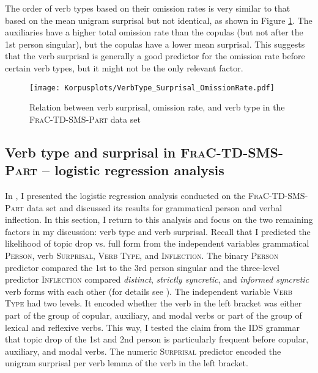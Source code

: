 The order of verb types based on their omission rates is very similar to that based on the mean unigram surprisal but not identical, as shown in Figure \ref{fig:frac.surprisal.rate.verb.type}.
The auxiliaries have a higher total omission rate than the copulas (but not after the 1st person singular), but the copulas have a lower mean surprisal.
This suggests that the verb surprisal is generally a good predictor for the omission rate before certain verb types, but it might not be the only relevant factor.

\begin{figure}
\centering
\texttt{[image: Korpusplots/VerbType\_Surprisal\_OmissionRate.pdf]}
\caption{Relation between verb surprisal, omission rate, and verb type in the \textsc{FraC-TD-SMS-Part} data set}
\label{fig:frac.surprisal.rate.verb.type}
\end{figure}

\subsection{Verb type and surprisal in \textsc{FraC-TD-SMS-Part} -- logistic regression analysis}\label{sec:corpus.regression.rep}
In , I presented the logistic regression analysis conducted on the \textsc{FraC-TD-SMS-Part} data set and discussed its results for grammatical person and verbal inflection.
In this section, I return to this analysis and focus on the two remaining factors in my discussion: verb type and verb surprisal.
Recall that I predicted the likelihood of topic drop vs. full form from the independent variables grammatical \textsc{Person}, verb \textsc{Surprisal}, \textsc{Verb Type}, and \textsc{Inflection}.
The binary \textsc{Person} predictor compared the 1st to the 3rd person singular and the three-level predictor \textsc{Inflection} compared \textit{distinct}, \textit{strictly syncretic}, and \textit{informed syncretic} verb forms with each other (for details see ).
The independent variable \textsc{Verb Type} had two levels.
It encoded whether the verb in the left bracket was either part of the group of copular, auxiliary, and modal verbs or part of the group of lexical and reflexive verbs.
This way, I tested the claim from the IDS grammar that topic drop of the 1st and 2nd person is particularly frequent before copular, auxiliary, and modal verbs.
The numeric \textsc{Surprisal} predictor encoded the unigram surprisal per verb lemma of the verb in the left bracket.

